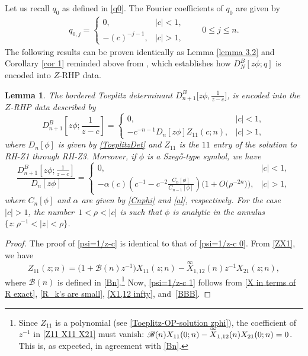 \documentclass[10pt,a4paper]{amsart}
\numberwithin{equation}{section}
\newtheorem{Lemma}[Theorem]{Lemma}
 { \theoremstyle{definition}
\newtheorem{Definition}[Theorem]{Definition}
\newtheorem{Example}[Theorem]{Example}
\newtheorem{Remark}[Theorem]{Remark}
\newtheorem{Question}[Theorem]{Question}
}
\newcommand{\al}{\alpha}
\newcommand{\di}{\displaystyle}
\begin{document}
Let us recall $q_0$ as defined in \eqref{q0}. The Fourier coefficients of $q_0$ are given by
		\begin{gather*}%
			q_{0,j} = \begin{cases}
				0, & |c|<1, \\
				-(c)^{-j-1}, & |c|>1,
			\end{cases}\qquad 0\leq j \leq n.
		\end{gather*}
		The following results can be proven identically as Lemma \ref{lemma 3.2} and Corollary \ref{cor 1} reminded above from \cite{BEGIL}, which establishes how $D^B_{N}[z\phi;q]$ is encoded into $Z$-RHP data.
		\begin{Lemma}\label{lem 2.15}
			The bordered Toeplitz determinant $D^B_{n+1}\big[z\phi,\di \tfrac{1}{z-c}\big]$, is encoded into the $Z$-RHP data described by
			\begin{equation}\label{psi=1/z-c}
				D^B_{n+1}\left[z\phi;\frac{1}{z-c}\right] = \begin{cases}
					0, & |c|<1, \\
					-c^{-n-1}D_{n}[z\phi]Z_{11}(c;n), & |c|>1,
				\end{cases}
			\end{equation}
			where $D_{n}[\phi]$ is given by \eqref{ToeplitzDet} and $Z_{11}$ is the $11$ entry of the solution to {\rm RH-Z1} through {\rm RH-Z3}. Moreover, if $\phi$ is a Szeg\H{o}-type symbol, we have
			\begin{equation}\label{psi=1/z-c 1}
				\frac{D^B_{n+1}\left[z\phi;\di \frac{1}{z-c}\right]}{D_{n}[z\phi]}	 = \begin{cases}
					0, & |c|<1, \\
					\di	- \al(c) \left( c^{-1} - c^{-2} \frac{C_n[\phi]}{C_{n-1}[\phi]} \right) \big(1 + O\big(\rho^{-2n}\big)\big), & |c|>1,
				\end{cases}
			\end{equation}
			where $C_n[\phi]$ and
			$\al$ are given by \eqref{Cnphi} and \eqref{al}, respectively. For the case $|c|>1$, the number~${1<\rho < |c|}$ is such that $\phi$ is analytic in the annulus $\big\{z\colon \rho^{-1}<|z|<\rho\big\}$.
		\end{Lemma}
		\begin{proof}
			The proof of \eqref{psi=1/z-c} is identical to that of \eqref{psi=1/z-c 0}. From \eqref{ZX1}, we have
			\begin{equation}\label{Z11 X11 X21}
				Z_{11}(z;n) = \big( 1 + \mathscr{B}(n) z^{-1} \big) X_{11}(z;n) -\overset{\infty}{X}_{1,12}(n) z^{-1} X_{21}(z;n),
			\end{equation}
			where $\mathscr{B}(n)$ is defined in \eqref{Bn}.\footnote{Since $Z_{11}$ is a polynomial (see \eqref{Toeplitz-OP-solution zphi}), the coefficient of $z^{-1}$ in \eqref{Z11 X11 X21} must vanish: $\mathscr{B}(n) X_{11}(0;n) -\smash{\overset{\infty}{X}}_{1,12}(n) X_{21}(0;n) = 0$. This is, as expected, in agreement with \eqref{Bn}.} Now, \eqref{psi=1/z-c 1} follows from \eqref{X in terms of R exact}, \eqref{R_k's are small}, \eqref{X1,12 infty}, and~\eqref{BBB}.
		\end{proof}
		
\end{document}
